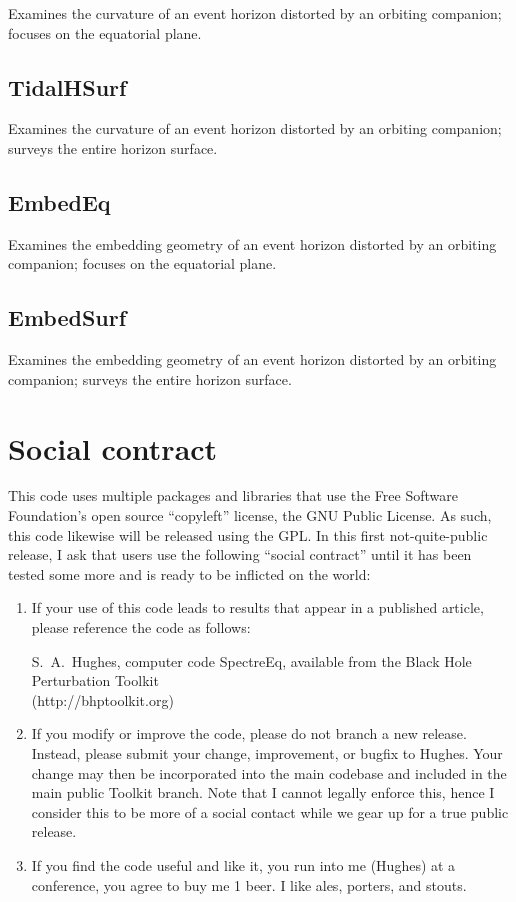 \documentclass[11pt]{article}
\begin{document}
Examines the curvature of an event horizon distorted by an orbiting companion; focuses on the equatorial plane.

\subsection{TidalHSurf}

Examines the curvature of an event horizon distorted by an orbiting companion; surveys the entire horizon surface.

\subsection{EmbedEq}

Examines the embedding geometry of an event horizon distorted by an orbiting companion; focuses on the equatorial plane.

\subsection{EmbedSurf}

Examines the embedding geometry of an event horizon distorted by an orbiting companion; surveys the entire horizon surface.

\clearpage

\section*{Social contract}

This code uses multiple packages and libraries that use the Free Software Foundation's open source ``copyleft'' license, the GNU Public License.  As such, this code likewise will be released using the GPL.  In this first not-quite-public release, I ask that users use the following ``social contract'' until it has been tested some more and is ready to be inflicted on the world:

\begin{enumerate}

\item If your use of this code leads to results that appear in a published article, please reference the code as follows:

S.\ A.\ Hughes, computer code {\sc SpectreEq}, available from the Black Hole Perturbation Toolkit\\ (http://bhptoolkit.org)

\item If you modify or improve the code, please do not branch a new release.  Instead, please submit your change, improvement, or bugfix to Hughes.  Your change may then be incorporated into the main codebase and included in the main public Toolkit branch.  Note that I cannot legally enforce this, hence I consider this to be more of a social contact while we gear up for a true public release.

\item If you find the code useful and like it, you run into me (Hughes) at a conference, you agree to buy me 1 beer.  I like ales, porters, and stouts.

\end{enumerate}
\end{document}
